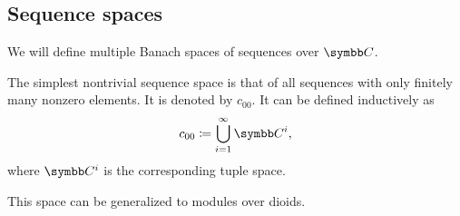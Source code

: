 \subsection{Sequence spaces}\label{subsec:sequence_spaces}

\begin{definition}\label{def:sequence_spaces}
  We will define multiple Banach spaces of sequences over \( \Co \).

  \begin{defenum}
     The simplest nontrivial sequence space is that of all sequences with only finitely many nonzero elements. It is denoted by \( c_{00} \). It can be defined inductively as
    \begin{equation*}
      c_{00} \coloneqq \bigcup_{i=1}^\infty \Co^i,
    \end{equation*}
    where \( \Co^i \) is the corresponding tuple space.

    This space can be generalized to modules over dioids.
  \end{defenum}
\end{definition}
